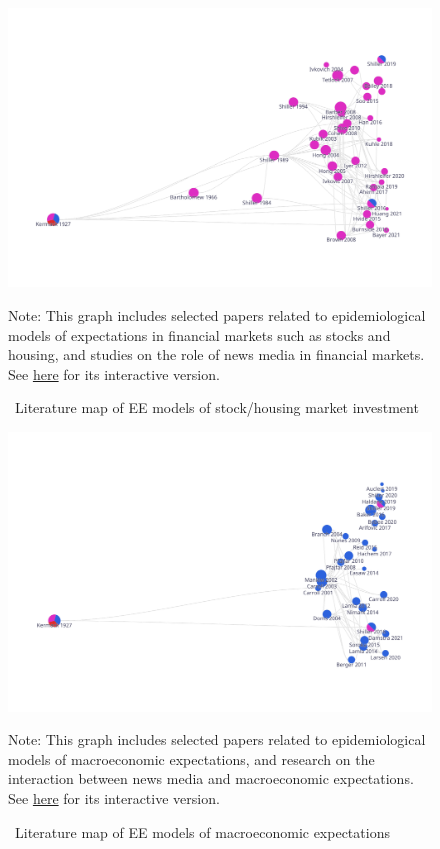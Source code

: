 \newpage

\begin{figure}[!ht] \centering  %
	\caption{ ~Literature map of EE models of stock/housing market investment}
	\label{fig:graph_investment}
	\centerline{\includegraphics[width=\textwidth]{./figures/graph_investment}}
			\begin{flushleft}
	{\footnotesize Note: This graph includes selected papers related to epidemiological models of expectations in financial markets such as stocks and housing, and studies on the role of news media in financial markets. See \href{https://app.litmaps.co/shared/E25276CA-8725-437B-8241-11961EFB3FB4}{here} for its interactive version.}
					\end{flushleft}
\end{figure}

\newpage


\begin{figure}[!ht] \centering  %
		\caption{ ~Literature map of EE models of macroeconomic expectations}
	\label{fig:graph_macro}
	\centerline{\includegraphics[width=\textwidth]{./figures/graph_macro}}
				\begin{flushleft}
		{\footnotesize Note: This graph includes selected papers related to epidemiological models of macroeconomic expectations, and research on the interaction between news media and macroeconomic expectations. See \href{https://app.litmaps.co/shared/289F57F4-FDE5-4F94-B1A9-2BA7419DB719}{here} for its interactive version.}
							\end{flushleft}
\end{figure}

